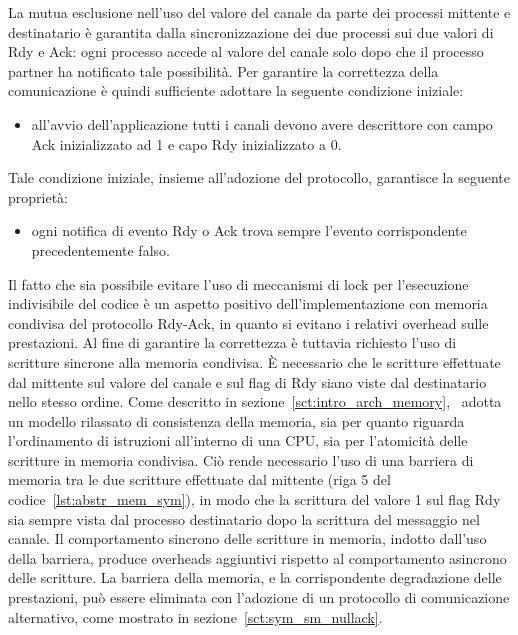 La mutua esclusione nell'uso del valore del canale da parte dei processi mittente e destinatario \`e garantita dalla sincronizzazione dei due processi sui due valori di Rdy e Ack: ogni processo accede al valore del canale solo dopo che il processo partner ha notificato tale possibilit\`a. Per garantire la correttezza della comunicazione \`e quindi sufficiente adottare la seguente condizione iniziale:
\begin{itemize}
\item all'avvio dell'applicazione tutti i canali devono avere descrittore con campo Ack inizializzato ad 1 e capo Rdy inizializzato a 0.
\end{itemize}
Tale condizione iniziale, insieme all'adozione del protocollo, garantisce la seguente propriet\`a:
\begin{itemize}
\item ogni notifica di evento Rdy o Ack trova sempre l'evento corrispondente precedentemente falso.
\end{itemize}

Il fatto che sia possibile evitare l'uso di meccanismi di lock per l'esecuzione indivisibile del codice \`e un aspetto positivo dell'implementazione con memoria condivisa del protocollo Rdy-Ack, in quanto si evitano i relativi overhead sulle prestazioni. Al fine di garantire la correttezza \`e tuttavia richiesto l'uso di scritture sincrone alla memoria condivisa. \`E necessario che le scritture effettuate dal mittente sul valore del canale e sul flag di Rdy siano viste dal destinatario nello stesso ordine. Come descritto in sezione~\ref{sct:intro_arch_memory}, \tile\ adotta un modello rilassato di consistenza della memoria, sia per quanto riguarda l'ordinamento di istruzioni all'interno di una CPU, sia per l'atomicit\`a delle scritture in memoria condivisa. Ci\`o rende necessario l'uso di una barriera di memoria tra le due scritture effettuate dal mittente (riga 5 del codice~\ref{lst:abstr_mem_sym}), in modo che la scrittura del valore 1 sul flag Rdy sia sempre vista dal processo destinatario dopo la scrittura del messaggio nel canale. Il comportamento sincrono delle scritture in memoria, indotto dall'uso della barriera, produce overheads aggiuntivi rispetto al comportamento asincrono delle scritture. La barriera della memoria, e la corrispondente degradazione delle prestazioni, pu\`o essere eliminata con l'adozione di un protocollo di comunicazione alternativo, come mostrato in sezione~\ref{sct:sym_sm_nullack}.

